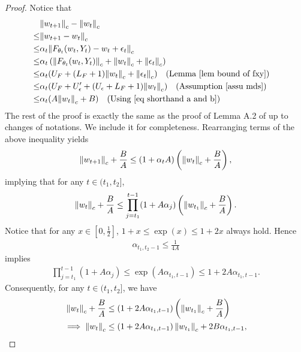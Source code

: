 \documentclass[twoside,11pt]{article}
\numberwithin{assucounter}{section}
\begin{document}
\begin{proof}
  Notice that 
  \begin{align}
      &\norm{w_{t+1}}_c - \norm{w_t}_c \\
      \leq& \norm{w_{t+1} - w_t}_c \\
      \leq& \alpha_t \norm{F_{\theta_t}(w_t, Y_t) - w_t + \epsilon_t}_c  \\
      \leq& \alpha_t \left( \norm{F_{\theta_t}(w_t, Y_t)}_c + \norm{w_t}_c + \norm{\epsilon_t}_c \right) \\
      \leq&\alpha_t (U_F + (L_F + 1)\norm{w_t}_c + \norm{\epsilon_t}_c) \qq{(Lemma~\ref{lem bound of fxy})} \\
      \leq&\alpha_t (U_F + U_\epsilon' + (U_\epsilon + L_F + 1)\norm{w_t}_c) \qq{(Assumption~\ref{assu mds})} \\
      \label{eq tmp 8}
      \leq& \alpha_t (A\norm{w_t}_c + B) \qq{(Using \eqref{eq shorthand a and b})}
  \end{align}
  The rest of the proof is exactly the same as the proof of Lemma A.2 of \citet{chen2021lyapunov} up to changes of notations. 
  We include it for completeness.
  Rearranging terms of the above inequality yields 
  \begin{align}
    \norm{w_{t+1}}_c + \frac{B}{A} \leq (1 + \alpha_t A)\left(\norm{w_t}_c + \frac{B}{A}\right),
  \end{align}
  implying that for any $t \in (t_1, t_2]$,
  \begin{align}
    \norm{w_t}_c + \frac{B}{A} \leq \prod_{j=t_1}^{t-1} (1 + A\alpha_j) \left(\norm{w_{t_1}}_c + \frac{B}{A}\right) .
  \end{align}
  Notice that for any $x \in [0, \frac{1}{2}]$,
  $1 + x \leq \exp(x) \leq 1 + 2x$ always hold.
  Hence 
  \begin{align}
    \alpha_{t_1, t_2-1} \leq \frac{1}{4A} 
  \end{align}
  implies
  \begin{align}
    \prod_{j=t_1}^{t-1} (1 + A\alpha_j) \leq \exp(A\alpha_{t_1, t-1}) \leq 1 + 2A \alpha_{t_1, t-1}.
  \end{align}
  Consequently, for any $t \in (t_1, t_2]$,
  we have
  \begin{align}
    \norm{w_t}_c + \frac{B}{A} &\leq \left(1 + 2A \alpha_{t_1, t-1}\right) \left(\norm{w_{t_1}}_c + \frac{B}{A} \right) \\
    \implies \norm{w_t}_c & \leq \left(1 + 2A \alpha_{t_1, t-1}\right) \norm{w_{t_1}}_c + 2B\alpha_{t_1, t-1},
  \end{align}

\end{proof}
\end{document}

